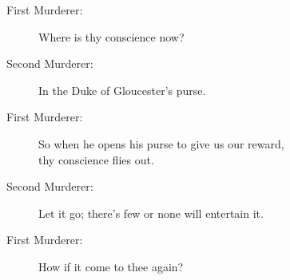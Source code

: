 \documentclass{article}
\begin{document}
\begin{description}
\item[First Murderer:] 
\hspace{1pt}Where is thy conscience now?\\
\end{description}
\begin{description}
\item[Second Murderer:] 
\hspace{1pt}In the Duke of Gloucester's purse.\\
\end{description}
\begin{description}
\item[First Murderer:] 
\hspace{1pt}So when he opens his purse to give us our reward,\\
\hspace{1pt}thy conscience flies out.\\
\end{description}
\begin{description}
\item[Second Murderer:] 
\hspace{1pt}Let it go; there's few or none will entertain it.\\
\end{description}
\begin{description}
\item[First Murderer:] 
\hspace{1pt}How if it come to thee again?\\
\end{description}
\end{document}

